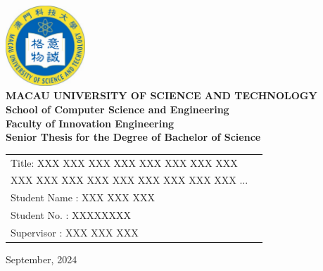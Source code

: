 \documentclass[12pt,a4paper]{article}
\numberwithin{equation}{section}
\begin{document}
\linespread{1}
\setlength{\parskip}{1em}


\begin{titlepage}
    \centering
    \includegraphics[width=3cm]{logo_colored.pdf}\\[2.25cm]
    
    {\fontsize{15pt}{18pt}\selectfont\textbf{MACAU UNIVERSITY OF SCIENCE AND TECHNOLOGY}}\\[2.25cm]
    {\fontsize{15pt}{18pt}\selectfont\textbf{School of Computer Science and Engineering\\[0.5cm]
    Faculty of Innovation Engineering}}\\[2.25cm]
    {\fontsize{15pt}{18pt}\selectfont \textbf{Senior Thesis for the Degree of Bachelor of Science}}\\[2.25cm]

    \begin{spacing}{2}
      \noindent
      \hspace*{1cm}
      \begin{minipage}{\dimexpr\textwidth - 1cm\relax}
        {\fontsize{15pt}{18pt}\selectfont
        \begin{tabular}{@{}l l@{}}
          Title: XXX XXX XXX XXX XXX XXX XXX XXX \\
                 XXX XXX XXX XXX XXX XXX XXX XXX XXX ... \\[1cm]
          Student Name \hspace{4pt}: XXX XXX XXX \\[0cm]
          Student No. \hspace{16pt}: XXXXXXXX \\[0.5cm]
          Supervisor \hspace{26pt}: XXX XXX XXX \\
        \end{tabular}
        }
      \end{minipage}
    \end{spacing}

    \vfill
    {\large September, 2024}
\end{titlepage}
\end{document}
